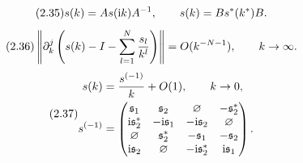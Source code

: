 \begin{equation}
\originaleq{2.35}
s(k)=As(\ii k)A^{-1},\qquad s(k)=Bs^*(k^*)B.
\end{equation}
\begin{equation}
\originaleq{2.36}
\left\|\partial_k^j\left(s(k)-I-\sum\limits_{l=1}^N\dfrac{s_l}{k^l}\right)\right\|
=O(k^{-N-1}),\qquad k\to\infty.
\end{equation}
\begin{equation}
\originaleq{2.37}
\begin{aligned}
s(k)&=\dfrac{s^{(-1)}}{k}+O(1),\qquad k\to0,\\
s^{(-1)}&=\begin{pmatrix}
\mathfrak s_1&\mathfrak s_2&\varnothing&-\mathfrak s_2^*\\
\ii\mathfrak s_2^*&-\ii\mathfrak s_1&-\ii\mathfrak s_2&\varnothing\\
\varnothing&\mathfrak s_2^*&-\mathfrak s_1&-\mathfrak s_2\\
\ii\mathfrak s_2&\varnothing&-\ii\mathfrak s_2^*&\ii\mathfrak s_1
\end{pmatrix}.
\end{aligned}
\end{equation}
